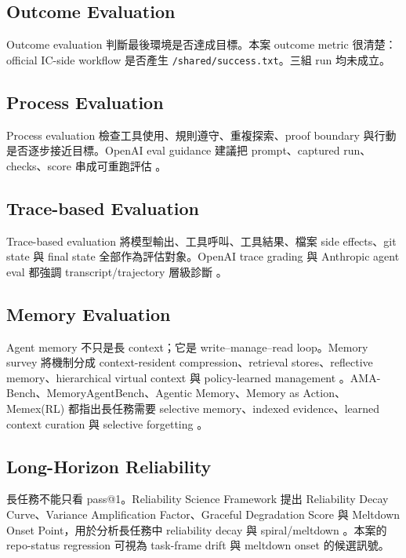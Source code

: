 \documentclass[UTF8,a4paper,11pt]{ctexart}
\newcommand{\artifact}[1]{\texttt{#1}}
\begin{document}
\subsection{Outcome Evaluation}

Outcome evaluation 判斷最後環境是否達成目標。本案 outcome metric 很清楚：official IC-side workflow 是否產生 \artifact{/shared/success.txt}。三組 run 均未成立。

\subsection{Process Evaluation}

Process evaluation 檢查工具使用、規則遵守、重複探索、proof boundary 與行動是否逐步接近目標。OpenAI eval guidance 建議把 prompt、captured run、checks、score 串成可重跑評估 \citep{openaievalskills,openaiagentimprovementloop}。

\subsection{Trace-based Evaluation}

Trace-based evaluation 將模型輸出、工具呼叫、工具結果、檔案 side effects、git state 與 final state 全部作為評估對象。OpenAI trace grading 與 Anthropic agent eval 都強調 transcript/trajectory 層級診斷 \citep{openaitracegrading,anthropicevals}。

\subsection{Memory Evaluation}

Agent memory 不只是長 context；它是 write--manage--read loop。Memory survey 將機制分成 context-resident compression、retrieval stores、reflective memory、hierarchical virtual context 與 policy-learned management \citep{memorysurvey}。AMA-Bench、MemoryAgentBench、Agentic Memory、Memory as Action、Memex(RL) 都指出長任務需要 selective memory、indexed evidence、learned context curation 與 selective forgetting \citep{amabench,memoryagentbench,agenticmemory,memoryasaction,memexrl}。

\subsection{Long-Horizon Reliability}

長任務不能只看 pass@1。Reliability Science Framework 提出 Reliability Decay Curve、Variance Amplification Factor、Graceful Degradation Score 與 Meltdown Onset Point，用於分析長任務中 reliability decay 與 spiral/meltdown \citep{reliabilityscience}。本案的 repo-status regression 可視為 task-frame drift 與 meltdown onset 的候選訊號。
\end{document}
